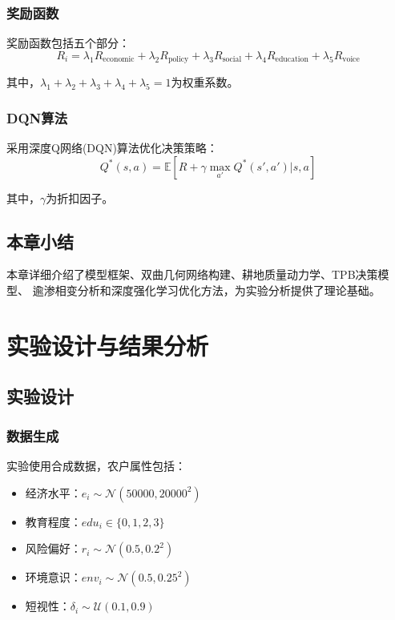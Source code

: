 \documentclass[12pt,a4paper]{article}
\numberwithin{equation}{section}
\begin{document}
\subsubsection{奖励函数}

奖励函数包括五个部分：
\begin{equation}
R_i = \lambda_1 R_{\text{economic}} + \lambda_2 R_{\text{policy}} + \lambda_3 R_{\text{social}} + \lambda_4 R_{\text{education}} + \lambda_5 R_{\text{voice}}
\label{eq:reward_function}
\end{equation}

其中，$\lambda_1 + \lambda_2 + \lambda_3 + \lambda_4 + \lambda_5 = 1$为权重系数。

\subsubsection{DQN算法}

采用深度Q网络(DQN)算法优化决策策略：
\begin{equation}
Q^*(s, a) = \mathbb{E}[R + \gamma \max_{a'} Q^*(s', a') | s, a]
\label{eq:q_function}
\end{equation}

其中，$\gamma$为折扣因子。

\subsection{本章小结}

本章详细介绍了模型框架、双曲几何网络构建、耕地质量动力学、TPB决策模型、
逾渗相变分析和深度强化学习优化方法，为实验分析提供了理论基础。

\newpage

\section{实验设计与结果分析}

\subsection{实验设计}

\subsubsection{数据生成}

实验使用合成数据，农户属性包括：
\begin{itemize}
    \item 经济水平：$e_i \sim \mathcal{N}(50000, 20000^2)$
    \item 教育程度：$edu_i \in \{0, 1, 2, 3\}$
    \item 风险偏好：$r_i \sim \mathcal{N}(0.5, 0.2^2)$
    \item 环境意识：$env_i \sim \mathcal{N}(0.5, 0.25^2)$
    \item 短视性：$\delta_i \sim \mathcal{U}(0.1, 0.9)$
\end{itemize}
\end{document}

